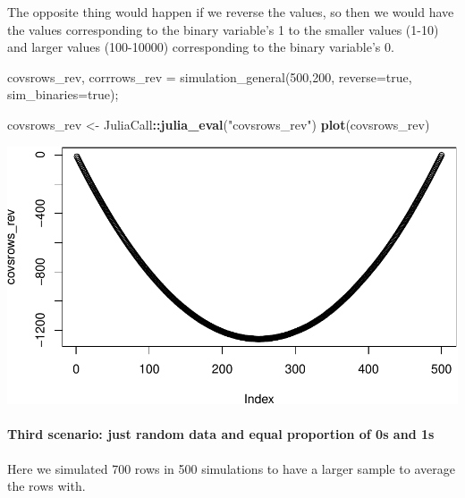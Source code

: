 \documentclass[]{article}
\newenvironment{Shaded}{\begin{snugshade}}{\end{snugshade}}
\newcommand{\FloatTok}[1]{\textcolor[rgb]{0.00,0.00,0.81}{#1}}
\newcommand{\KeywordTok}[1]{\textcolor[rgb]{0.13,0.29,0.53}{\textbf{#1}}}
\newcommand{\NormalTok}[1]{#1}
\newcommand{\OperatorTok}[1]{\textcolor[rgb]{0.81,0.36,0.00}{\textbf{#1}}}
\newcommand{\StringTok}[1]{\textcolor[rgb]{0.31,0.60,0.02}{#1}}
\let\oldparagraph\paragraph
\renewcommand{\paragraph}[1]{\oldparagraph{#1}\mbox{}}
\begin{document}
The opposite thing would happen if we reverse the values, so then we
would have the values corresponding to the binary variable's 1 to the
smaller values (1-10) and larger values (100-10000) corresponding to the
binary variable's 0.

\begin{Shaded}
\begin{Highlighting}[]
\NormalTok{covsrows_rev, corrrows_rev = simulation_general(}\FloatTok{500}\NormalTok{,}\FloatTok{200}\NormalTok{, reverse=true, sim_binaries=true);}
\end{Highlighting}
\end{Shaded}

\begin{Shaded}
\begin{Highlighting}[]
\NormalTok{covsrows_rev <-}\StringTok{ }\NormalTok{JuliaCall}\OperatorTok{::}\KeywordTok{julia_eval}\NormalTok{(}\StringTok{"covsrows_rev"}\NormalTok{)}
\KeywordTok{plot}\NormalTok{(covsrows_rev)}
\end{Highlighting}
\end{Shaded}

\includegraphics{./figures/unnamed-chunk-13-1.pdf}

\newpage

\hypertarget{third-scenario-just-random-data-and-equal-proportion-of-0s-and-1s}{%
\paragraph{Third scenario: just random data and equal proportion of 0s
and
1s}\label{third-scenario-just-random-data-and-equal-proportion-of-0s-and-1s}}

Here we simulated 700 rows in 500 simulations to have a larger sample to
average the rows with.
\end{document}
